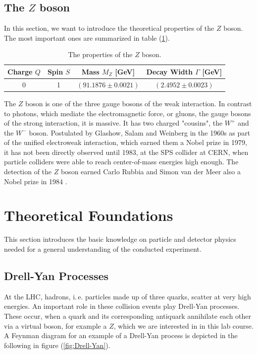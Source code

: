 \documentclass[twocolumn,
			   showpacs,%
               nofootinbib,
               aps,%
               prd,
               notitlepage,
               showkeys,
               10pt]{revtex4-1}
\begin{document}
\subsection{The $Z$ boson}
In this section, we want to introduce the theoretical properties of the $Z$ boson. The most important ones are summarized in table (\ref{tab:Z_props}).

\begin{table}[!htbp]
	\centering
	\renewcommand{\arraystretch}{1.5}
	\begin{tabular}{c|c|c|c}
	Charge $Q$ & Spin $S$ & Mass $M_Z$ [GeV] & Decay Width $\Gamma$ [GeV] \\ \hline 
	 0 & 1 & $(91.1876 \pm 0.0021)$ & $(2.4952 \pm 0.0023)$ \\
		\end{tabular}
	\caption{\label{tab:Z_props}The properties of the $Z$ boson.}
	\label{tab:Z_props}
\end{table}

The $Z$ boson is one of the three gauge bosons of the weak interaction. In contrast to photons, which mediate the electromagnetic force, or gluons, the gauge bosons of the strong interaction, it is massive. It has two charged "cousins", the $W^+$ and the $W^-$ boson. Postulated by Glashow, Salam and Weinberg in the 1960s as part of the unified electroweak interaction, which earned them a Nobel prize in 1979, it has not been directly observed until 1983, at the SPS collider at CERN, when particle colliders were able to reach center-of-mass energies high enough. The detection of the $Z$ boson earned Carlo Rubbia and Simon van der Meer also a Nobel prize in 1984 \cite{F91manual}.   


\section{Theoretical Foundations}
This section introduces the basic knowledge on particle and detector physics needed for a general understanding of the conducted experiment.

\subsection{Drell-Yan Processes}
At the LHC, hadrons, i.\,e. particles made up of three quarks, scatter at very high energies. An important role in these collision events play Drell-Yan processes. These occur, when a quark and its corresponding antiquark annihilate each other via a virtual boson, for example a $Z$, which we are interested in in this lab course. A Feynman diagram for an example of a Drell-Yan process is depicted in the following in figure (\ref{fig:Drell-Yan}).
\end{document}
